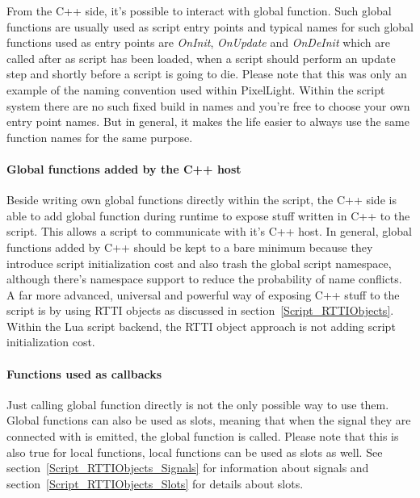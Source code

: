 From the C++ side, it's possible to interact with global function. Such global functions are usually used as script entry points and typical names for such global functions used as entry points are \emph{OnInit}, \emph{OnUpdate} and \emph{OnDeInit} which are called after as script has been loaded, when a script should perform an update step and shortly before a script is going to die. Please note that this was only an example of the naming convention used within PixelLight. Within the script system there are no such fixed build in names and you're free to choose your own entry point names. But in general, it makes the life easier to always use the same function names for the same purpose.


\paragraph{Global functions added by the C++ host}
Beside writing own global functions directly within the script, the C++ side is able to add global function during runtime to expose stuff written in C++ to the script. This allows a script to communicate with it's C++ host. In general, global functions added by C++ should be kept to a bare minimum because they introduce script initialization cost and also trash the global script namespace, although there's namespace support to reduce the probability of name conflicts. A far more advanced, universal and powerful way of exposing C++ stuff to the script is by using RTTI objects as discussed in section~\ref{Script_RTTIObjects}. Within the Lua script backend, the RTTI object approach is not adding script initialization cost.


\paragraph{Functions used as callbacks}
Just calling global function directly is not the only possible way to use them. Global functions can also be used as slots, meaning that when the signal they are connected with is emitted, the global function is called. Please note that this is also true for local functions, local functions can be used as slots as well. See section~\ref{Script_RTTIObjects_Signals} for information about signals and section~\ref{Script_RTTIObjects_Slots} for details about slots.

